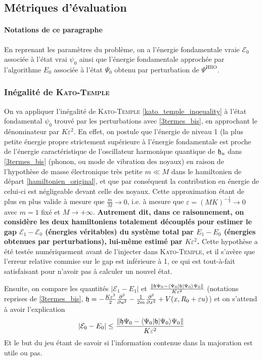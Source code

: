 \documentclass[svgnames,dvipsnames,a4paper,10pt,french]{report}
\begin{document}
\subsection{Métriques d'évaluation}
\paragraph{Notations de ce paragraphe}
En reprenant les paramètres du problème, on a l'énergie fondamentale vraie $\mathcal{E}_0$ associée à l'état vrai $\psi_0$ ainsi que l'énergie fondamentale approchée par l'algorithme $E_0$ associée à l'état $\Psi_0$ obtenu par perturbation de $\Psi^{\text{HBO}}$.

\subsubsection{Inégalité de \textsc{Kato-Temple}}
 On va appliquer l'inégalité de \textsc{Kato-Temple} \ref{kato_temple_inqeuality}  à l'état fondamental $\psi_0$ trouvé par les perturbations avec \ref{3termes_bis}, en approchant le dénominateur par $K\varepsilon^2$. En effet, on postule que l'énergie de niveau 1 (la plus petite énergie propre strictement supérieure à l'énergie fondamentale est proche de l'énergie caractéristique de l'oscillateur harmonique quantique de $\frak{h}_u$ dans \ref{3termes_bis} (phonon, ou mode de vibration des noyaux) en raison de l'hypothèse de masse électronique très petite $m \ll M$ dans le hamiltonien de départ \ref{hamiltonien_original}, et que par conséquent la contribution en énergie de celui-ci est négligeable devant celle des noyaux. Cette approximation étant de plus en plus valide à mesure que $\frac{m}{M} \rightarrow 0$, i.e. à mesure que $\varepsilon = (MK)^{-\frac{1}{4}} \rightarrow 0$ avec $m=1$ fixé et $M\rightarrow + \infty$. \textbf{Autrement dit, dans ce raisonnement, on considère les deux hamiltoniens totalement découplés pour estimer le gap $\mathcal{E}_1-\mathcal{E}_0$ (énergies véritables) du système total par $E_1-E_0$ (énergies obtenues par perturbations), lui-même estimé par $K\varepsilon^2$.} Cette hypothèse a été testée numériquement avant de l'injecter dans \textsc{Kato-Temple}, et il s'avère que l'erreur relative commise sur le gap est inférieure à 1\textperthousand, ce qui est tout-à-fait satisfaisant pour n'avoir pas à calculer un nouvel état.


Ensuite, on compare les quantités $|\mathcal{E}_1-E_1|$ et $\frac{\|\frak{h}\Psi_0 -  \langle \Psi_0 | \frak{h} | \Psi_0 \rangle \Psi_0 \| }{K\varepsilon^2}$
(notations reprises de \ref{3termes_bis}, $\frak{h}=-\frac{K\varepsilon^2}{2}\frac{\partial^2}{\partial u^2} - \frac{1}{2m} \frac{\partial^2}{\partial x^2} + V(x, R_0+\varepsilon u)$) et on s'attend à avoir l'explication
\begin{equation}
    |\mathcal{E}_0-E_0| \le \frac{\|\frak{h}\Psi_0 -  \langle \Psi_0 | \frak{h} | \Psi_0 \rangle \Psi_0 \| }{K\varepsilon^2}
\end{equation}
Et le but du jeu étant de savoir si l'information contenue dans la majoration est utile ou pas.
\end{document}

